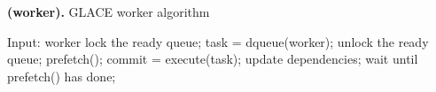 \documentclass[preprint,11pt]{elsarticle}
\begin{document}
\begin{enumerate}
\begin{algorithm}
\caption{{\bf (worker).} GLACE worker algorithm}
\label{alg:worker}
\begin{algorithmic}
\STATE Input: worker
  \STATE lock the ready queue;
  \STATE task = dqueue(worker);
  \STATE unlock the ready queue;
    \STATE prefetch();
    \STATE commit = execute(task);
      \STATE update dependencies;
    \ENDIF
    \STATE wait until prefetch() has done;
  \ENDIF
\ENDWHILE
\end{algorithmic}
\end{algorithm}

\end{enumerate}

\end{document}
